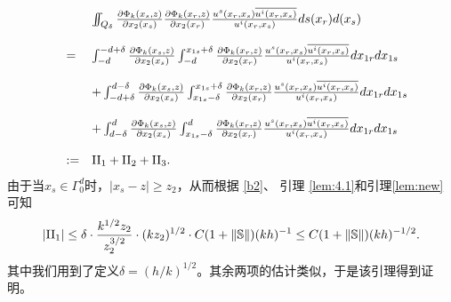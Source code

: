\begin{eqnarray*}
\begin{array}{lll}
& &\int\hskip-6pt\int_{Q_{\delta}}\frac{\partial\Phi_k(x_s,z)}{\partial x_2(x_s)}\frac{\partial\Phi_k(x_r,z)}{\partial x_2(x_r)}
  \frac{u^s(x_r,x_s)
  \overline{u^i(x_r,x_s)}}{u^i(x_r,x_s)}ds(x_r)d(x_s) \\
& &\\
&=&\int^{-d+\delta}_{-d}\frac{\partial\Phi_k(x_s,z)}{\partial x_2(x_s)}\int^{x_{1s}+\delta}_{-d}
\frac{\partial\Phi_k(x_r,z)}{\partial x_2(x_r)}\frac{u^s(x_r,x_s)
  \overline{u^i(x_r,x_s)}}{u^i(x_r,x_s)}dx_{1r}dx_{1s}\\
& &\\
& &+\int^{d-\delta}_{-d+\delta}\frac{\partial\Phi_k(x_s,z)}{\partial x_2(x_s)}\int^{x_{1s}+\delta}_{x_{1s}-\delta}\frac{\partial\Phi_k(x_r,z)}{\partial x_2(x_r)}\frac{u^s(x_r,x_s)
  \overline{u^i(x_r,x_s)}}{u^i(x_r,x_s)}dx_{1r}dx_{1s}\\
& &\\
& &+\int^d_{d-\delta}\frac{\partial\Phi_k(x_s,z)}{\partial x_2(x_s)}\int^d_{x_{1s}-\delta}\frac{\partial\Phi_k(x_r,z)}{\partial x_2(x_r)}
  \frac{u^s(x_r,x_s)
  \overline{u^i(x_r,x_s)}}{u^i(x_r,x_s)}dx_{1r}dx_{1s}\\
  & &\\
&:=&{\rm II_1}+{\rm II_2}+{\rm II_3}.
\end{array}
\end{eqnarray*}
由于当$x_s\in\Gamma_0^d$时，$|x_s-z|\geq z_2$，从而根据 \eqref{b2}、 引理 \ref{lem:4.1}和引理\ref{lem:new}可知
$$
|{\rm II}_1|\leq\delta\cdot\frac{k^{1/2}z_2}{z_2^{3/2}}\cdot (kz_2)^{1/2}\cdot C(1+\|\mathbb{S}\|)(kh)^{-1}\leq C(1+\|\mathbb{S}\|)(kh)^{-1/2}.
$$
其中我们用到了定义$\delta=(h/k)^{1/2}$。其余两项的估计类似，于是该引理得到证明。

